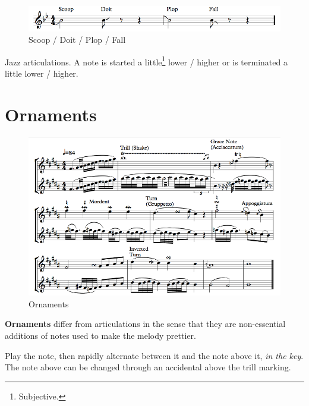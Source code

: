 \begin{figure}[h]
    \begin{center}
        \includegraphics[width=1\textwidth]{img/fall}
        \caption{Scoop / Doit / Plop / Fall}
    \end{center}
\end{figure}

\begin{definition}
    Jazz articulations. A note is started a little\footnote{Subjective.} lower / higher or is terminated a little lower / higher.
\end{definition}

\section{Ornaments}

\begin{figure}[h]
    \begin{center}
        \includegraphics[width=1\textwidth]{img/ornaments}
        \caption{Ornaments}
    \end{center}
\end{figure}

\textbf{Ornaments} differ from articulations in the sense that they are non-essential additions of notes used to make the melody prettier.

\begin{definition}[Trill]
    Play the note, then rapidly alternate between it and the note above it, \emph{in the key}. The note above can be changed through an accidental above the trill marking.
\end{definition}

